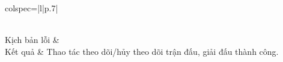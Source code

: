 \documentclass{article}
\begin{document}
\begin{longtblr}[caption = {Đặc tả usecase 	Theo dõi trận đấu, giải đấu},
  label = {tab:usecase1-spec},]{colspec={|l|p{.7\linewidth}|}}
\begin{minipage}{\linewidth}
\begin{enumerate}[label={\textbf{\textcolor{red}{A\arabic*}} --}, align=left, itemsep=-5pt]
    \end{enumerate}
    \vskip 1pt
  \end{minipage}
  \\\hline
  Kịch bản lỗi         &                                                                                              \\\hline
  Kết quả              & Thao tác theo dõi/hủy theo dõi trận đấu, giải đấu thành công.                                                                 \\\hline
\end{longtblr}
\end{document}
